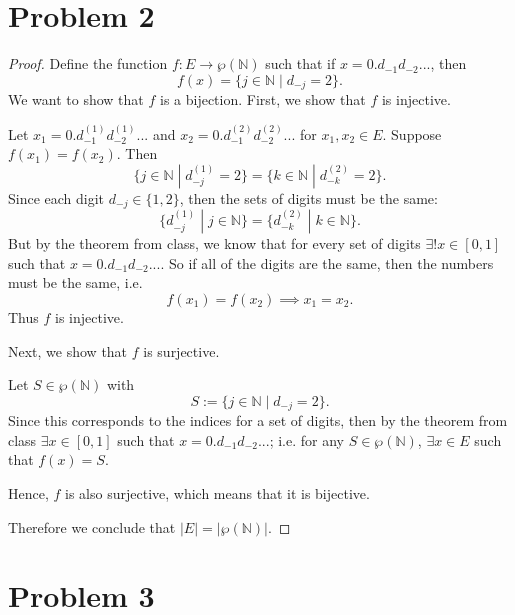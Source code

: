 \documentclass{article}
\begin{document}
\section*{Problem 2}
\begin{proof}
	Define the function $f: E\rightarrow \wp(\mathbb{N})$ such that if $x=0.d_{-1}d_{-2}...$, then 
	\begin{equation}
		f(x) = \{j \in \mathbb{N} \;|\; d_{-j} = 2\}.
	\end{equation}
	We want to show that $f$ is a bijection. First, we show that $f$ is injective.
	
	Let $x_1=0.d_{-1}^{(1)}d_{-2}^{(1)}...$ and $x_2=0.d_{-1}^{(2)}d_{-2}^{(2)}...$ for $x_1, x_2 \in E$. Suppose $f(x_1) = f(x_2)$. Then
	\begin{equation}
		\{j\in\mathbb{N} \;|\; d_{-j}^{(1)}=2\} = \{k\in\mathbb{N} \;|\; d_{-k}^{(2)}=2\}.
	\end{equation}
	Since each digit $d_{-j}\in\{1, 2\}$, then the sets of digits must be the same:
	\begin{equation}
		\{d_{-j}^{(1)} \;|\; j\in\mathbb{N}\} = \{d_{-k}^{(2)} \;|\; k\in\mathbb{N}\}.
	\end{equation}
	But by the theorem from class, we know that for every set of digits $\exists ! x\in[0,1]$ such that $x=0.d_{-1}d_{-2}...$. So if all of the digits are the same, then the numbers must be the same, i.e.
	\begin{equation}
		f(x_1) = f(x_2) \implies x_1 = x_2.
	\end{equation}
	Thus $f$ is injective.
	
	Next, we show that $f$ is surjective. 
	
	Let $S\in\wp(\mathbb{N})$ with
	\begin{equation}
		S:=\{j\in\mathbb{N} \;|\; d_{-j}=2\}.
	\end{equation}
	 Since this corresponds to the indices for a set of digits, then by the theorem from class $\exists x\in [0,1]$ such that $x=0.d_{-1}d_{-2}...$; i.e. for any $S\in\wp(\mathbb{N})$, $\exists x\in E$ such that $f(x) = S$. 
	 
	 Hence, $f$ is also surjective, which means that it is bijective.
	 
	 Therefore we conclude that $|E|=|\wp(\mathbb{N})|$.
\end{proof}
\section*{Problem 3}
\end{document}
